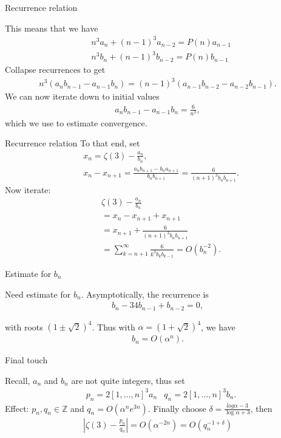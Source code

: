\documentclass{beamer}
\newcommand{\Z}{\mathbb{Z}}
\begin{document}
\begin{frame}{Recurrence relation}{}

This means that we have
\begin{align*}
    &n^3 a_n + (n-1)^3 a_{n-2} = P(n)a_{n-1}
    \\&
    n^3 b_n + (n-1)^3 b_{n-2} = P(n)b_{n-1}
\end{align*}
\pause
Collapse recurrences to get 
\begin{align*}
    n^3(a_nb_{n-1} - a_{n-1}b_n) = (n-1)^3(a_{n-1}b_{n-2} - a_{n-2}b_{n-1}).
\end{align*}
\pause
We can now iterate down to initial values
\begin{align*}
    a_nb_{n-1} - a_{n-1}b_n = \frac{6}{n^3},
\end{align*}
which we use to estimate convergence. 

\end{frame}
\begin{frame}{Recurrence relation}{}
To that end, set
\begin{align*}
    &x_n = \zeta(3) - \frac{a_n}{b_n},
    \\&
    x_n - x_{n+1} = \frac{a_n b_{n+1} - b_n a_{n+1}}{b_n b_{n+1}} = \frac{6}{(n+1)^3b_n b_{n+1}}.
\end{align*}
\pause
Now iterate:
\begin{align*}
    &\zeta(3) - \frac{a_n}{b_n} 
    \\&= x_n - x_{n+1} + x_{n+1}
    \\&= x_{n+1} + \frac{6}{(n+1)^3 b_n b_{n+1}}
    \\& 
    =\sum_{k=n+1}^\infty \frac{6}{k^3 b_k b_{k-1}} = O(b_n^{-2}).
\end{align*}


\end{frame}

\begin{frame}{Estimate for $b_n$}{}

Need estimate for $b_n$. 
Asymptotically, the recurrence is 
\begin{align*}
    b_n - 34b_{n-1} + b_{n-2} = 0,
\end{align*}

with roots $(1\pm \sqrt{2})^4$. 
\pause
Thus with $\alpha = (1+\sqrt{2})^4$, we have 
\begin{align*}
    b_n = O(\alpha^n).
\end{align*}

\end{frame}
\begin{frame}{Final touch}{}

Recall, $a_n$ and $b_n$ are not quite integers, thus set
\begin{align*}
    &p_n = 2 [1,\dots, n]^3 a_n
    &q_n = 2[1,\dots, n]^3 b_n. 
\end{align*}
\pause
Effect: $p_n, q_n \in \Z$ and $q_n = O(\alpha^n e^{3n})$.
\pause
Finally choose $\delta = \frac{log\alpha - 3}{\log\alpha + 3}$, 
\pause
then 
\begin{align*}
    \left| \zeta(3) - \frac{p_n}{q_n} \right| = O(\alpha^{-2n}) = O(q_n^{-1+\delta})
\end{align*}

\end{frame}
\end{document}
